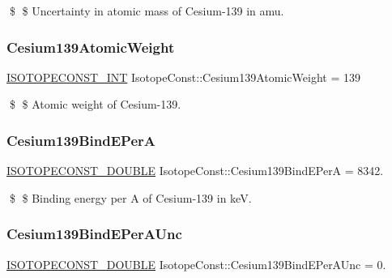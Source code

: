 \$ \$ Uncertainty in atomic mass of Cesium-\/139 in amu. \mbox{\label{group___isotope_const-_cesium-_cs139_gac26c42dd408e8e4638634dff07ce9de1}} 
\subsubsection{\texorpdfstring{Cesium139\+Atomic\+Weight}{Cesium139AtomicWeight}}
{\footnotesize\ttfamily \mbox{\hyperlink{group___isotope_const-_macros_ga5f18360b3e99483a35c32d789e62621c}{I\+S\+O\+T\+O\+P\+E\+C\+O\+N\+S\+T\+\_\+\+I\+NT}} Isotope\+Const\+::\+Cesium139\+Atomic\+Weight = 139}

\$ \$ Atomic weight of Cesium-\/139. \mbox{\label{group___isotope_const-_cesium-_cs139_ga0105b536880c7a6d233d743862c5fe6d}} 
\subsubsection{\texorpdfstring{Cesium139\+Bind\+E\+PerA}{Cesium139BindEPerA}}
{\footnotesize\ttfamily \mbox{\hyperlink{group___isotope_const-_macros_ga8f45a7272ce02c0b4c65c44636ed719a}{I\+S\+O\+T\+O\+P\+E\+C\+O\+N\+S\+T\+\_\+\+D\+O\+U\+B\+LE}} Isotope\+Const\+::\+Cesium139\+Bind\+E\+PerA = 8342.}

\$ \$ Binding energy per A of Cesium-\/139 in keV. \mbox{\label{group___isotope_const-_cesium-_cs139_gab502df682d1a8718ad5d4ef3dcb8846b}} 
\subsubsection{\texorpdfstring{Cesium139\+Bind\+E\+Per\+A\+Unc}{Cesium139BindEPerAUnc}}
{\footnotesize\ttfamily \mbox{\hyperlink{group___isotope_const-_macros_ga8f45a7272ce02c0b4c65c44636ed719a}{I\+S\+O\+T\+O\+P\+E\+C\+O\+N\+S\+T\+\_\+\+D\+O\+U\+B\+LE}} Isotope\+Const\+::\+Cesium139\+Bind\+E\+Per\+A\+Unc = 0.}

